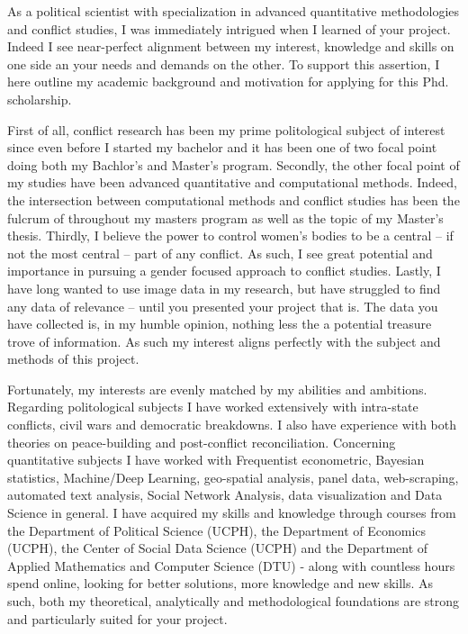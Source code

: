 \documentclass[a4paper]{article}
\begin{document}

As a political scientist with specialization in advanced quantitative methodologies and conflict studies, I was immediately intrigued when I learned of your project. Indeed I see near-perfect alignment between my interest, knowledge and skills on one side an your needs and demands on the other. To support this assertion, I here outline my academic background and motivation for applying for this Phd. scholarship.\par

First of all, conflict research has been my prime politological subject of interest since even before I started my bachelor and it has been one of two focal point doing both my Bachlor's and Master's program. Secondly, the other focal point of my studies have been advanced quantitative and computational methods. Indeed, the intersection between computational methods and conflict studies has been the fulcrum of throughout my masters program as well as the topic of my Master's thesis. Thirdly, I believe the power to control women's bodies to be a central -- if not the most central -- part of any conflict. As such, I see great potential and importance in pursuing a gender focused approach to conflict studies. Lastly, I have long wanted to use image data in my research, but have struggled to find any data of relevance -- until you presented your project that is. The data you have collected is, in my humble opinion, nothing less the a potential treasure trove of information. As such my interest aligns perfectly with the subject and methods of this project.\par

Fortunately, my interests are evenly matched by my abilities and ambitions. Regarding politological subjects I have worked extensively with intra-state conflicts, civil wars and democratic breakdowns. I also have experience with both theories on peace-building and post-conflict reconciliation. Concerning quantitative subjects I have worked with Frequentist econometric, Bayesian statistics, Machine/Deep Learning, geo-spatial analysis, panel data, web-scraping, automated text analysis, Social Network Analysis, data visualization and Data Science in general. I have acquired my skills and knowledge through courses from the Department of Political Science (UCPH), the Department of Economics (UCPH), the Center of Social Data Science (UCPH) and the Department of Applied Mathematics and Computer Science (DTU) - along with countless hours spend online, looking for better solutions, more knowledge and new skills. As such, both my theoretical, analytically and methodological foundations are strong and particularly suited for your project.\par %
\end{document}
